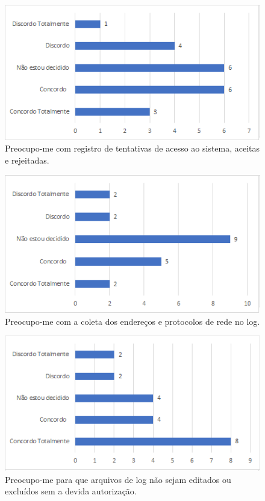 \begin{figure}[!t]
\centering
\includegraphics[scale=0.7]{figuras das questoes/5.4.png}
\caption{Preocupo-me com registro de tentativas de acesso ao sistema, aceitas e rejeitadas.}
\end{figure}
 
\begin{figure}[!t]
\centering
\includegraphics[scale=0.7]{figuras das questoes/5.5.png}
\caption{Preocupo-me com a coleta dos endereços e protocolos de rede no log.}
\end{figure}
 
\begin{figure}[!t]
\centering
\includegraphics[scale=0.7]{figuras das questoes/5.6.png}
\caption{Preocupo-me para que arquivos de log não sejam editados ou excluídos sem a devida autorização.}
\end{figure}
   
